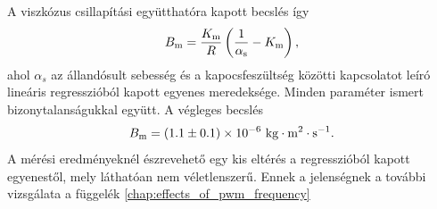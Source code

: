 A viszkózus csillapítási együtthatóra kapott becslés így
\begin{equation}
    B_{\mathrm{m}} = \frac{K_{\mathrm{m}}}{R}\left(\frac{1}{\alpha_{\mathrm{s}}} - K_{\mathrm{m}}\right),
\end{equation}
ahol \(\alpha_s\) az állandósult sebesség és a kapocsfeszültség közötti kapcsolatot 
leíró lineáris regresszióból kapott egyenes meredeksége. Minden paraméter ismert bizonytalanságukkal 
együtt. A végleges becslés
\begin{equation}
    B_{\mathrm{m}} = (1.1 \pm 0.1)\times 10^{-6}~\mathrm{kg\cdot m^2\cdot s^{-1}}.
\end{equation}
A mérési eredményeknél észrevehető egy kis eltérés a regresszióból kapott egyenestől, mely láthatóan nem 
véletlenszerű. Ennek a jelenségnek a további vizsgálata a függelék \ref{chap:effects_of_pwm_frequency}

